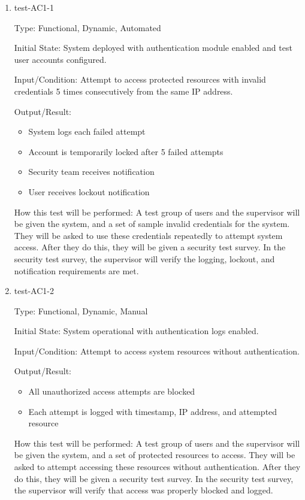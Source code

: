 \documentclass[12pt, titlepage]{article}
\begin{document}
\begin{enumerate}

    \item{test-AC1-1} \label{test-AC1-1}
    
    Type: Functional, Dynamic, Automated
    
    Initial State: System deployed with authentication module enabled and test user accounts configured.
    
    Input/Condition: Attempt to access protected resources with invalid credentials 5 times consecutively from the same IP address.
    
    Output/Result: 
    \begin{itemize}
        \item System logs each failed attempt
        \item Account is temporarily locked after 5 failed attempts
        \item Security team receives notification
        \item User receives lockout notification
    \end{itemize}
    
    How this test will be performed: A test group of users and the supervisor will be given the system, and a set of sample invalid credentials for the system. They will be asked to use these credentials repeatedly to attempt system access. After they do this, they will be given a security test survey. In the security test survey, the supervisor will verify the logging, lockout, and notification requirements are met.

    \item{test-AC1-2}  \label{test-AC1-2}
    
    Type: Functional, Dynamic, Manual
    
    Initial State: System operational with authentication logs enabled.
    
    Input/Condition: Attempt to access system resources without authentication.
    
    Output/Result: 
    \begin{itemize}
        \item All unauthorized access attempts are blocked
        \item Each attempt is logged with timestamp, IP address, and attempted resource
    \end{itemize}
    
    How this test will be performed: A test group of users and the supervisor will be given the system, and a set of protected resources to access. They will be asked to attempt accessing these resources without authentication. After they do this, they will be given a security test survey. In the security test survey, the supervisor will verify that access was properly blocked and logged.



\end{enumerate}
\end{document}
